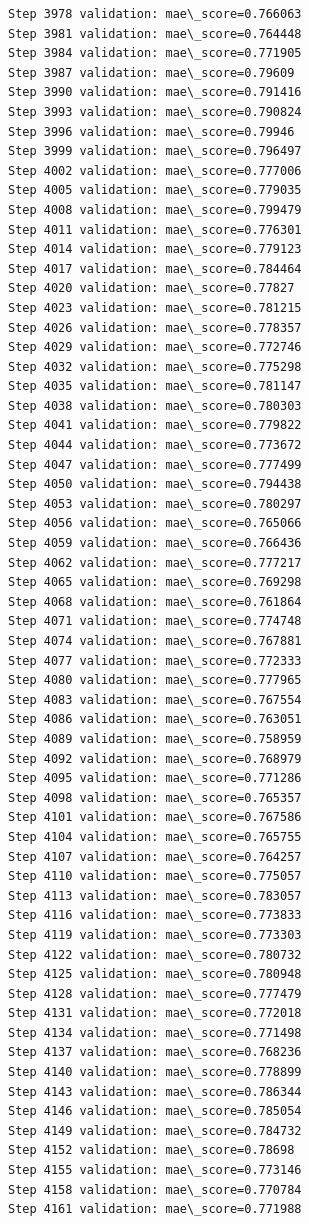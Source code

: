 \documentclass[11pt]{article}
\begin{document}
\begin{Verbatim}[commandchars=\\\{\}]
Step 3978 validation: mae\_score=0.766063
Step 3981 validation: mae\_score=0.764448
Step 3984 validation: mae\_score=0.771905
Step 3987 validation: mae\_score=0.79609
Step 3990 validation: mae\_score=0.791416
Step 3993 validation: mae\_score=0.790824
Step 3996 validation: mae\_score=0.79946
Step 3999 validation: mae\_score=0.796497
Step 4002 validation: mae\_score=0.777006
Step 4005 validation: mae\_score=0.779035
Step 4008 validation: mae\_score=0.799479
Step 4011 validation: mae\_score=0.776301
Step 4014 validation: mae\_score=0.779123
Step 4017 validation: mae\_score=0.784464
Step 4020 validation: mae\_score=0.77827
Step 4023 validation: mae\_score=0.781215
Step 4026 validation: mae\_score=0.778357
Step 4029 validation: mae\_score=0.772746
Step 4032 validation: mae\_score=0.775298
Step 4035 validation: mae\_score=0.781147
Step 4038 validation: mae\_score=0.780303
Step 4041 validation: mae\_score=0.779822
Step 4044 validation: mae\_score=0.773672
Step 4047 validation: mae\_score=0.777499
Step 4050 validation: mae\_score=0.794438
Step 4053 validation: mae\_score=0.780297
Step 4056 validation: mae\_score=0.765066
Step 4059 validation: mae\_score=0.766436
Step 4062 validation: mae\_score=0.777217
Step 4065 validation: mae\_score=0.769298
Step 4068 validation: mae\_score=0.761864
Step 4071 validation: mae\_score=0.774748
Step 4074 validation: mae\_score=0.767881
Step 4077 validation: mae\_score=0.772333
Step 4080 validation: mae\_score=0.777965
Step 4083 validation: mae\_score=0.767554
Step 4086 validation: mae\_score=0.763051
Step 4089 validation: mae\_score=0.758959
Step 4092 validation: mae\_score=0.768979
Step 4095 validation: mae\_score=0.771286
Step 4098 validation: mae\_score=0.765357
Step 4101 validation: mae\_score=0.767586
Step 4104 validation: mae\_score=0.765755
Step 4107 validation: mae\_score=0.764257
Step 4110 validation: mae\_score=0.775057
Step 4113 validation: mae\_score=0.783057
Step 4116 validation: mae\_score=0.773833
Step 4119 validation: mae\_score=0.773303
Step 4122 validation: mae\_score=0.780732
Step 4125 validation: mae\_score=0.780948
Step 4128 validation: mae\_score=0.777479
Step 4131 validation: mae\_score=0.772018
Step 4134 validation: mae\_score=0.771498
Step 4137 validation: mae\_score=0.768236
Step 4140 validation: mae\_score=0.778899
Step 4143 validation: mae\_score=0.786344
Step 4146 validation: mae\_score=0.785054
Step 4149 validation: mae\_score=0.784732
Step 4152 validation: mae\_score=0.78698
Step 4155 validation: mae\_score=0.773146
Step 4158 validation: mae\_score=0.770784
Step 4161 validation: mae\_score=0.771988

\end{Verbatim}
\end{document}
